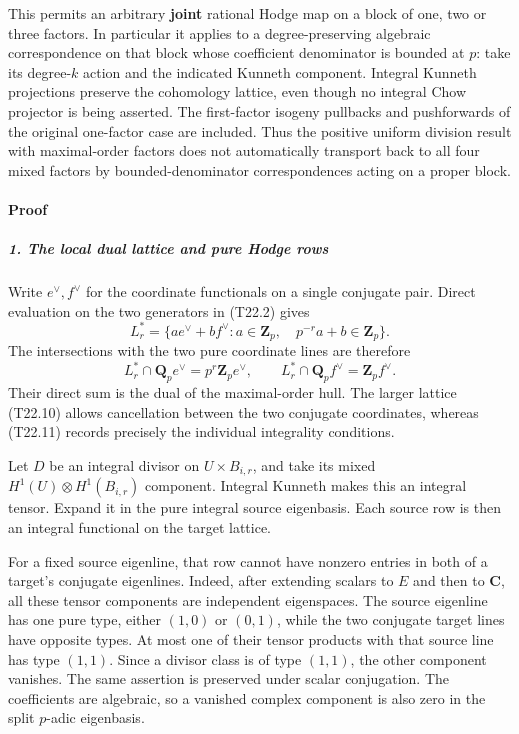This permits an arbitrary \textbf{joint} rational Hodge map on a block of one, two or three factors. In particular it applies to a degree-preserving algebraic correspondence on that block whose coefficient denominator is bounded at \(p\): take its degree-\(k\) action and the indicated Kunneth component. Integral Kunneth projections preserve the cohomology lattice, even though no integral Chow projector is being asserted. The first-factor isogeny pullbacks and pushforwards of the original one-factor case are included. Thus the positive uniform division result with maximal-order factors does not automatically transport back to all four mixed factors by bounded-denominator correspondences acting on a proper block.

\paragraph{Proof}\label{proof-3}

\subparagraph{1. The local dual lattice and pure Hodge rows}\label{the-local-dual-lattice-and-pure-hodge-rows}

Write \(e^\vee,f^\vee\) for the coordinate functionals on a single conjugate pair. Direct evaluation on the two generators in (T22.2) gives \[
 L_r^*=
 \{a e^\vee+b f^\vee:
       a\in\mathbf Z_p,\quad p^{-r}a+b\in\mathbf Z_p\}.
 \tag{T22.10}
\] The intersections with the two pure coordinate lines are therefore \[
 L_r^*\cap\mathbf Q_p e^\vee=p^r\mathbf Z_p e^\vee,
 \qquad
 L_r^*\cap\mathbf Q_p f^\vee=\mathbf Z_p f^\vee.
 \tag{T22.11}
\] Their direct sum is the dual of the maximal-order hull. The larger lattice (T22.10) allows cancellation between the two conjugate coordinates, whereas (T22.11) records precisely the individual integrality conditions.

Let \(D\) be an integral divisor on \(U\times B_{i,r}\), and take its mixed \(H^1(U)\otimes H^1(B_{i,r})\) component. Integral Kunneth makes this an integral tensor. Expand it in the pure integral source eigenbasis. Each source row is then an integral functional on the target lattice.

For a fixed source eigenline, that row cannot have nonzero entries in both of a target's conjugate eigenlines. Indeed, after extending scalars to \(E\) and then to \(\mathbf C\), all these tensor components are independent eigenspaces. The source eigenline has one pure type, either \((1,0)\) or \((0,1)\), while the two conjugate target lines have opposite types. At most one of their tensor products with that source line has type \((1,1)\). Since a divisor class is of type \((1,1)\), the other component vanishes. The same assertion is preserved under scalar conjugation. The coefficients are algebraic, so a vanished complex component is also zero in the split \(p\)-adic eigenbasis.

